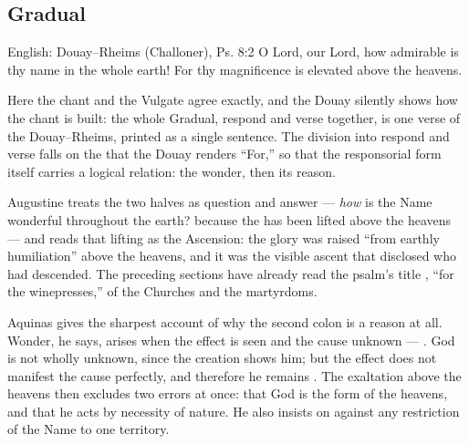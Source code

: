\elementguard
\subsection*{Gradual }


\begin{namedtranslation}{English: Douay--Rheims (Challoner), Ps. 8:2}
O Lord, our Lord, how admirable is thy name in the whole earth! For thy
magnificence is elevated above the heavens.
\end{namedtranslation}

Here the chant and the Vulgate agree exactly, and the Douay silently shows how
the chant is built: the whole Gradual, respond and verse together, is one verse
of the Douay--Rheims, printed as a single sentence. The division into respond and verse falls on the 
that the Douay renders ``For,'' so that the responsorial form itself carries a
logical relation: the wonder, then its reason.

\begin{witnessnote}
Augustine treats the two halves as question and answer --- \textit{how} is
the Name wonderful throughout the earth? because the  has
been lifted above the heavens --- and reads that lifting as the Ascension:
the glory was raised ``from earthly humiliation'' above the heavens, and it
was the visible ascent that disclosed who had descended. The preceding
sections have already read the psalm's title ,
``for the winepresses,'' of the Churches and the martyrdoms.
\end{witnessnote}

\begin{witnessnote}
Aquinas gives the sharpest account of why the second colon is a reason at all.
Wonder, he says, arises when the effect is seen and the cause unknown ---
. God is
not wholly unknown, since the creation shows him; but the effect does not
manifest the cause perfectly, and therefore he remains .
The exaltation above the heavens then excludes two errors at once: that God is
the form of the heavens, and that he acts by necessity of nature. He also
insists on  against any restriction of the Name to
one territory.
\end{witnessnote}

